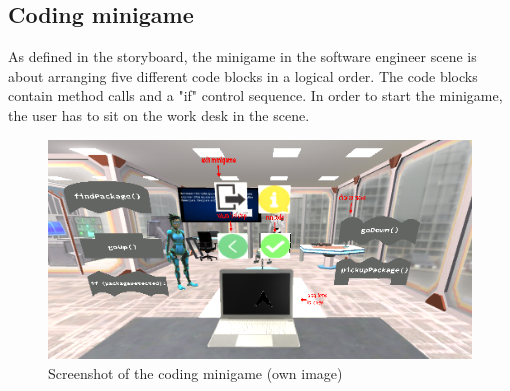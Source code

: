 \subsection{Coding minigame}
\label{minigame}
As defined in the storyboard, the minigame in the software engineer scene is about arranging five different code blocks in a logical order. The code blocks contain method calls and a "if" control sequence. In order to start the minigame, the user has to sit on the work desk in the scene.
\begin{figure}[h!]
  \includegraphics[width=16cm]{kapitel/se-minigame2.PNG}
  \centering
  \caption{Screenshot of the coding minigame (own image)}
  \label{fig:se-minigame}
\end{figure}


